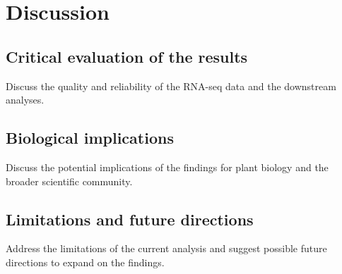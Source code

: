 \section{Discussion}

\subsection{Critical evaluation of the results}
Discuss the quality and reliability of the RNA-seq data and the downstream analyses.

\subsection{Biological implications}
Discuss the potential implications of the findings for plant biology and the broader scientific community.

\subsection{Limitations and future directions}
Address the limitations of the current analysis and suggest possible future directions to expand on the findings.